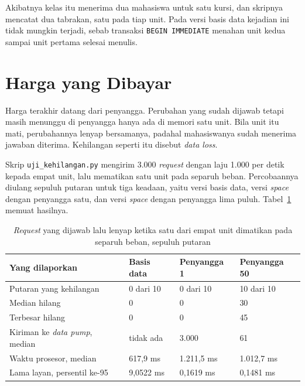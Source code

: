 Akibatnya kelas itu menerima dua mahasiswa untuk satu kursi, dan skripnya
mencatat dua tabrakan, satu pada tiap unit. Pada versi basis data kejadian ini
tidak mungkin terjadi, sebab transaksi \texttt{BEGIN IMMEDIATE} menahan unit
kedua sampai unit pertama selesai menulis.

\section{Harga yang Dibayar}

Harga terakhir datang dari penyangga. Perubahan yang sudah dijawab tetapi masih
menunggu di penyangga hanya ada di memori satu unit. Bila unit itu mati,
perubahannya lenyap bersamanya, padahal mahasiswanya sudah menerima jawaban
diterima. Kehilangan seperti itu disebut \textit{data
loss}.

Skrip \texttt{uji\_kehilangan.py} mengirim 3.000 \textit{request} dengan laju
1.000 per detik kepada empat unit, lalu mematikan satu unit pada separuh beban.
Percobaannya diulang sepuluh putaran untuk tiga keadaan, yaitu versi basis data,
versi \textit{space} dengan penyangga satu, dan versi \textit{space} dengan
penyangga lima puluh. Tabel~\ref{tab:kehilangan} memuat hasilnya.

\begin{table}[htbp]
  \centering
  \caption{\textit{Request} yang dijawab lalu lenyap ketika satu dari empat unit
    dimatikan pada separuh beban, sepuluh putaran}
  \label{tab:kehilangan}
  \begin{tabularx}{\textwidth}{|X|l|l|l|}
    \hline
    \textbf{Yang dilaporkan} & \textbf{Basis data} & \textbf{Penyangga 1} & \textbf{Penyangga 50} \\
    \hline
    Putaran yang kehilangan & 0 dari 10 & 0 dari 10 & 10 dari 10 \\
    \hline
    Median hilang & 0 & 0 & 30 \\
    \hline
    Terbesar hilang & 0 & 0 & 45 \\
    \hline
    Kiriman ke \textit{data pump}, median & tidak ada & 3.000 & 61 \\
    \hline
    Waktu prosesor, median & 617,9 ms & 1.211,5 ms & 1.012,7 ms \\
    \hline
    Lama layan, persentil ke-95 & 9,0522 ms & 0,1619 ms & 0,1481 ms \\
    \hline
  \end{tabularx}
\end{table}

